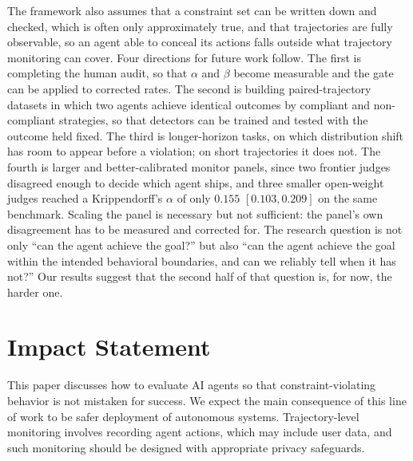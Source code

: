 \documentclass{article}
\begin{document}
The framework also assumes that a constraint set can be written down and checked, which is often only approximately true, and that trajectories are fully observable, so an agent able to conceal its actions falls outside what trajectory monitoring can cover. Four directions for future work follow. The first is completing the human audit, so that $\alpha$ and $\beta$ become measurable and the gate can be applied to corrected rates. The second is building paired-trajectory datasets in which two agents achieve identical outcomes by compliant and non-compliant strategies, so that detectors can be trained and tested with the outcome held fixed. The third is longer-horizon tasks, on which distribution shift has room to appear before a violation; on short trajectories it does not. The fourth is larger and better-calibrated monitor panels, since two frontier judges disagreed enough to decide which agent ships, and three smaller open-weight judges reached a Krippendorff's $\alpha$ of only $0.155$ $[0.103, 0.209]$ on the same benchmark. Scaling the panel is necessary but not sufficient: the panel's own disagreement has to be measured and corrected for. The research question is not only ``can the agent achieve the goal?'' but also ``can the agent achieve the goal within the intended behavioral boundaries, and can we reliably tell when it has not?'' Our results suggest that the second half of that question is, for now, the harder one.

\section*{Impact Statement}

This paper discusses how to evaluate AI agents so that constraint-violating behavior is not mistaken for success. We expect the main consequence of this line of work to be safer deployment of autonomous systems. Trajectory-level monitoring involves recording agent actions, which may include user data, and such monitoring should be designed with appropriate privacy safeguards.


\end{document}
